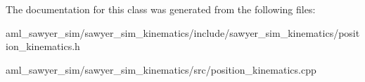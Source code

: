 The documentation for this class was generated from the following files\-:\begin{DoxyCompactItemize}
\item 
aml\-\_\-sawyer\-\_\-sim/sawyer\-\_\-sim\-\_\-kinematics/include/sawyer\-\_\-sim\-\_\-kinematics/position\-\_\-kinematics.\-h\item 
aml\-\_\-sawyer\-\_\-sim/sawyer\-\_\-sim\-\_\-kinematics/src/position\-\_\-kinematics.\-cpp\end{DoxyCompactItemize}

